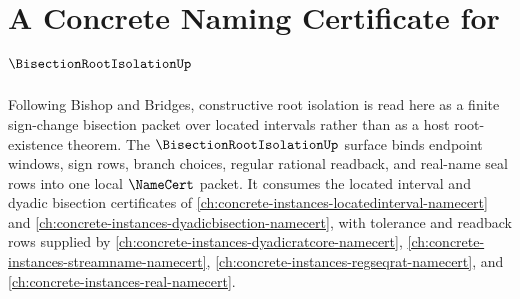 \chapter{A Concrete Naming Certificate for $\BisectionRootIsolationUp$}
\label{ch:concrete-instances-bisectionrootisolation-namecert}

Following Bishop and Bridges, constructive root isolation is read here as a finite sign-change bisection packet over located intervals rather than as a host root-existence theorem. The $\BisectionRootIsolationUp$ surface binds endpoint windows, sign rows, branch choices, regular rational readback, and real-name seal rows into one local $\NameCert$ packet. It consumes the located interval and dyadic bisection certificates of \autoref{ch:concrete-instances-locatedinterval-namecert} and \autoref{ch:concrete-instances-dyadicbisection-namecert}, with tolerance and readback rows supplied by \autoref{ch:concrete-instances-dyadicratcore-namecert}, \autoref{ch:concrete-instances-streamname-namecert}, \autoref{ch:concrete-instances-regseqrat-namecert}, and \autoref{ch:concrete-instances-real-namecert}.

